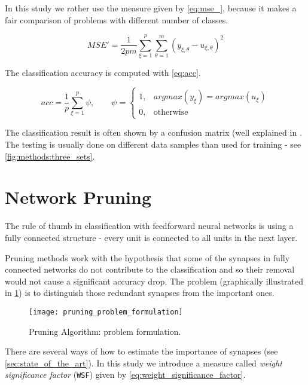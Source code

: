 In this study we rather use the measure given by \cref{eq:mse_}, because it makes a fair comparison of problems with different number of classes.

\begin{equation} \label{eq:mse_}
MSE' = \frac{1}{2 p m} \displaystyle \sum^{p}_{\xi=1} \displaystyle \sum^{m}_{\theta=1} (y_{\xi,\theta} - u_{\xi,\theta})^2
\end{equation}

The classification accuracy is computed with \cref{eq:acc}.

\begin{equation} \label{eq:acc}
acc = \frac{1}{p} \displaystyle \sum^{p}_{\xi=1} \psi, \qquad \psi = \begin{cases}
    1, & argmax(y_{\xi}) = argmax(u_{\xi}) \\
    0, & \text{otherwise}
\end{cases} 
\end{equation}

The classification result is often shown by a confusion matrix (well explained in \citep{sklearn}. The testing is usually done on different data samples than used for training - see \cref{fig:methods:three_sets}.

\section{Network Pruning} \label{sec:network_pruning}
The rule of thumb in classification with feedforward neural networks is using a fully connected structure - every unit is connected to all units in the next layer. 

Pruning methods work with the hypothesis that some of the synapses in fully connected networks do not contribute to the classification and so their removal would not cause a significant accuracy drop. The problem (graphically illustrated in \cref{fig:methods:pruning_problem_formulation}) is to distinguish those redundant synapses from the important ones.

\begin{figure}[H]
  \centering
  \texttt{[image: pruning\_problem\_formulation]}
  \caption{Pruning Algorithm: problem formulation.}
  \label{fig:methods:pruning_problem_formulation}
\end{figure}

There are several ways of how to estimate the importance of synapses (see \cref{sec:state_of_the_art}). In this study we introduce a measure called \textit{weight significance factor} (\texttt{WSF}) given by \cref{eq:weight_significance_factor}.

